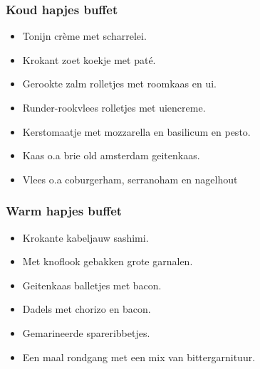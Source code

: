 \subsubsection{Koud hapjes buffet}
\begin{itemize}
	\item Tonijn crème met scharrelei.
	\item Krokant zoet koekje met paté.
	\item Gerookte zalm rolletjes met roomkaas en ui.
	\item Runder-rookvlees rolletjes met uiencreme.
	\item Kerstomaatje met mozzarella en basilicum en pesto.
	\item Kaas o.a brie old amsterdam geitenkaas.
	\item Vlees o.a coburgerham, serranoham en nagelhout
\end{itemize}
\subsubsection{Warm hapjes buffet}

\begin{itemize}
	\item Krokante kabeljauw sashimi.
	\item Met knoflook gebakken grote garnalen.
	\item Geitenkaas balletjes met bacon.
	\item Dadels met chorizo en bacon.
	\item Gemarineerde spareribbetjes.
	\item Een maal rondgang met een mix van bittergarnituur.
\end{itemize}
